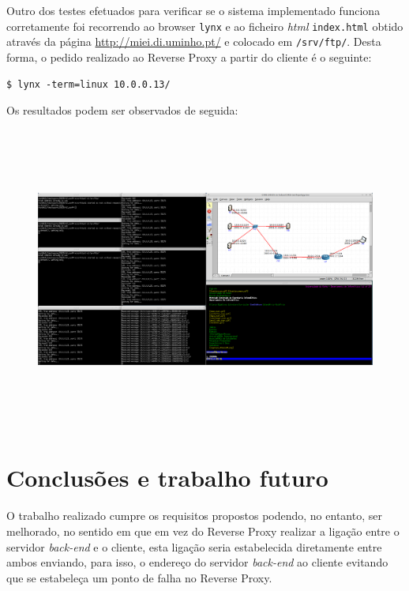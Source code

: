 \documentclass{article}
\begin{document}
Outro dos testes efetuados para verificar se o sistema implementado funciona corretamente foi recorrendo ao browser \texttt{lynx} e ao ficheiro \textit{html} \texttt{index.html} obtido através da página \underline{http://miei.di.uminho.pt/} e colocado em \texttt{/srv/ftp/}. Desta forma, o pedido realizado ao Reverse Proxy a partir do cliente é o seguinte:

\begin{verbatim}
$ lynx -term=linux 10.0.0.13/
\end{verbatim}
Os resultados podem ser observados de seguida:

\begin{figure}[H]
    \advance\leftskip-3.7cm
    \includegraphics[height=10cm]{teste3.png}
\end{figure}

\newpage

\section{Conclusões e trabalho futuro}
O trabalho realizado cumpre os requisitos propostos podendo, no entanto, ser melhorado, no sentido em que em vez do Reverse Proxy realizar a ligação entre o servidor \textit{back-end} e o cliente, esta ligação seria estabelecida diretamente entre ambos enviando, para isso, o endereço do servidor \textit{back-end} ao cliente evitando que se estabeleça um ponto de falha no Reverse Proxy.
\end{document}

